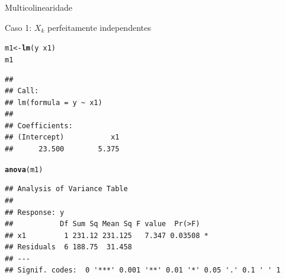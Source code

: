 \documentclass{beamer}\usepackage[]{graphicx}\usepackage[]{color}
\makeatletter
\newcommand{\hlopt}[1]{\textcolor[rgb]{0,0,0}{#1}}%
\newcommand{\hlstd}[1]{\textcolor[rgb]{0.345,0.345,0.345}{#1}}%
\newcommand{\hlkwb}[1]{\textcolor[rgb]{0.69,0.353,0.396}{#1}}%
\newcommand{\hlkwd}[1]{\textcolor[rgb]{0.737,0.353,0.396}{\textbf{#1}}}%
\newenvironment{kframe}{%
 \def\at@end@of@kframe{}%
 \ifinner\ifhmode%
  \def\at@end@of@kframe{\end{minipage}}%
  \begin{minipage}{\columnwidth}%
 \fi\fi%
 \def\FrameCommand##1{\hskip\@totalleftmargin \hskip-\fboxsep
 \colorbox{shadecolor}{##1}\hskip-\fboxsep
     \hskip-\linewidth \hskip-\@totalleftmargin \hskip\columnwidth}%
 \MakeFramed {\advance\hsize-\width
   \@totalleftmargin\z@ \linewidth\hsize
   \@setminipage}}%
 {\par\unskip\endMakeFramed%
 \at@end@of@kframe}
\newenvironment{knitrout}{}{} %
\renewenvironment{knitrout}{\setlength{\topsep}{0mm}}{}
\makeatother
\begin{document}
\begin{frame}[fragile]{Multicolinearidade}

Caso 1: $X_k$ perfeitamente independentes
\vfill

\begin{knitrout}\tiny
{}\color{fgcolor}\begin{kframe}
\begin{alltt}
\hlstd{m1} \hlkwb{<-} \hlkwd{lm}\hlstd{(y} \hlopt{~} \hlstd{x1)}
\hlstd{m1}
\end{alltt}
\begin{verbatim}
## 
## Call:
## lm(formula = y ~ x1)
## 
## Coefficients:
## (Intercept)           x1  
##      23.500        5.375
\end{verbatim}
\begin{alltt}
\hlkwd{anova}\hlstd{(m1)}
\end{alltt}
\begin{verbatim}
## Analysis of Variance Table
## 
## Response: y
##           Df Sum Sq Mean Sq F value  Pr(>F)  
## x1         1 231.12 231.125   7.347 0.03508 *
## Residuals  6 188.75  31.458                  
## ---
## Signif. codes:  0 '***' 0.001 '**' 0.01 '*' 0.05 '.' 0.1 ' ' 1
\end{verbatim}
\end{kframe}
\end{knitrout}

\end{frame}
\end{document}
